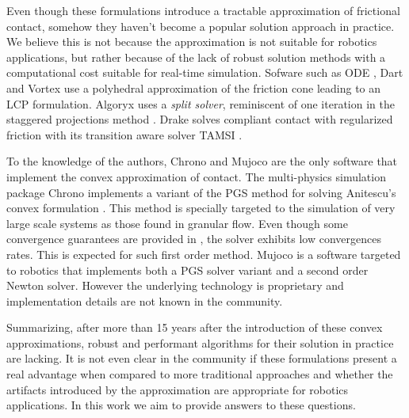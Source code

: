Even though these formulations introduce a tractable approximation of frictional
contact, somehow they haven't become a popular solution approach in practice. We
believe this is not because the approximation is not suitable for robotics
applications, but rather because of the lack of robust solution methods with a
computational cost suitable for real-time simulation. Sofware such as ODE
\cite{bib:ode}, Dart \cite{bib:dart} and Vortex \cite{bib:vortex} use a
polyhedral approximation of the friction cone leading to an LCP formulation.
Algoryx \cite{bib:algoryx} uses a \emph{split solver}, reminiscent of one
iteration in the staggered projections method \cite{bib:Kaufman2008}. Drake
\cite{bib:drake} solves compliant contact with regularized friction with its
transition aware solver TAMSI \cite{bib:castro2020}. 

To the knowledge of the authors, Chrono \cite{bib:hrono2016} and Mujoco
\cite{bib:mujoco} are the only software that implement the convex approximation
of contact. The multi-physics simulation package Chrono implements a variant of
the PGS method for solving Anitescu's convex formulation \cite{bib:tasora2011}.
This method is specially targeted to the simulation of very large scale systems
as those found in granular flow. Even though some convergence guarantees are
provided in \cite{bib:anitescu2010}, the solver exhibits low convergences rates.
This is expected for such first order method. Mujoco is a software targeted to
robotics that implements both a PGS solver variant \cite{bib:todorov2014} and a
second order Newton solver. However the underlying technology is proprietary and
implementation details are not known in the community.

Summarizing, after more than 15 years after the introduction of these convex
approximations, robust and performant algorithms for their solution in practice
are lacking. It is not even clear in the community if these formulations present
a real advantage when compared to more traditional approaches and whether the
artifacts introduced by the approximation are appropriate for robotics
applications. In this work we aim to provide answers to these questions. 

